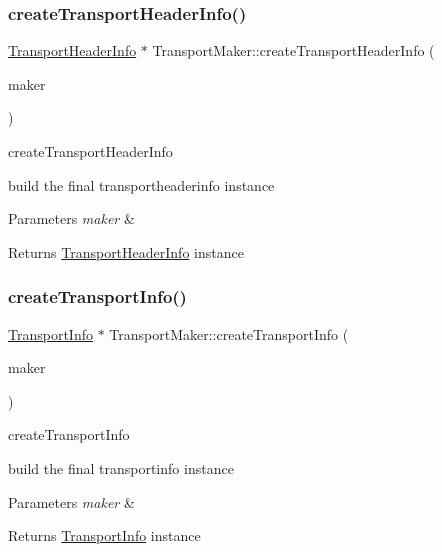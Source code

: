 \subsubsection{\texorpdfstring{create\+Transport\+Header\+Info()}{createTransportHeaderInfo()}}
{\footnotesize\ttfamily \hyperlink{classAlexaEvent_1_1TransportHeaderInfo}{Transport\+Header\+Info} $\ast$ Transport\+Maker\+::create\+Transport\+Header\+Info (\begin{DoxyParamCaption}\item[{\hyperlink{classAlexaEvent_1_1TransportBuilderInterface}{Transport\+Builder\+Interface} $\ast$}]{maker }\end{DoxyParamCaption})}



create\+Transport\+Header\+Info 

build the final transportheaderinfo instance 
\begin{DoxyParams}{Parameters}
{\em maker} & \\
\hline
\end{DoxyParams}
\begin{DoxyReturn}{Returns}
\hyperlink{classAlexaEvent_1_1TransportHeaderInfo}{Transport\+Header\+Info} instance 
\end{DoxyReturn}
\mbox{\label{classAlexaEvent_1_1TransportMaker_aea75955275f3f8a64424d03f87b33dbe}} 
\subsubsection{\texorpdfstring{create\+Transport\+Info()}{createTransportInfo()}}
{\footnotesize\ttfamily \hyperlink{classAlexaEvent_1_1TransportInfo}{Transport\+Info} $\ast$ Transport\+Maker\+::create\+Transport\+Info (\begin{DoxyParamCaption}\item[{\hyperlink{classAlexaEvent_1_1TransportBuilderInterface}{Transport\+Builder\+Interface} $\ast$}]{maker }\end{DoxyParamCaption})}



create\+Transport\+Info 

build the final transportinfo instance 
\begin{DoxyParams}{Parameters}
{\em maker} & \\
\hline
\end{DoxyParams}
\begin{DoxyReturn}{Returns}
\hyperlink{classAlexaEvent_1_1TransportInfo}{Transport\+Info} instance 
\end{DoxyReturn}


